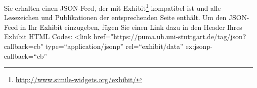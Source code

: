 Sie erhalten einen JSON-Feed, der mit Exhibit\footnote{\url{http://www.simile-widgets.org/exhibit/}} kompatibel ist und alle Lesezeichen und Publikationen der entsprechenden Seite enthält. Um den JSON-Feed in Ihr Exhibit einzugeben, fügen Sie einen Link dazu in den Header Ihres Exhibit HTML Codes:\newline
\newline
<link href="https://puma.ub.uni-stuttgart.de/tag/json?callback=cb" type=\enquote{application/jsonp} rel=\enquote{exhibit/data} ex:jsonp-callback=\enquote{cb}%
\newline

